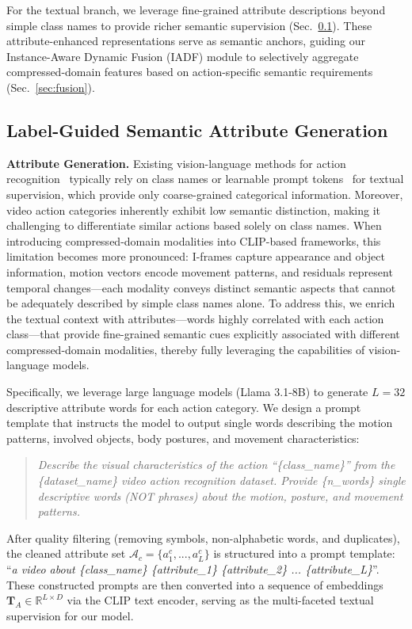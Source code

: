 \documentclass[runningheads]{llncs}
\begin{document}
For the textual branch, we leverage fine-grained attribute descriptions beyond simple class names to provide richer semantic supervision (Sec.~\ref{sec:attribute}). These attribute-enhanced representations serve as semantic anchors, guiding our Instance-Aware Dynamic Fusion (IADF) module to selectively aggregate compressed-domain features based on action-specific semantic requirements (Sec.~\ref{sec:fusion}).

\subsection{Label-Guided Semantic Attribute Generation}
\label{sec:attribute}

\noindent\textbf{Attribute Generation.} 
Existing vision-language methods for action recognition~\cite{wang2021actionclipnewparadigmvideo,ni2022expanding} typically rely on class names or learnable prompt tokens~\cite{zhou2022learning} for textual supervision, which provide only coarse-grained categorical information. Moreover, video action categories inherently exhibit low semantic distinction, making it challenging to differentiate similar actions based solely on class names. When introducing compressed-domain modalities into CLIP-based frameworks, this limitation becomes more pronounced: I-frames capture appearance and object information, motion vectors encode movement patterns, and residuals represent temporal changes---each modality conveys distinct semantic aspects that cannot be adequately described by simple class names alone. To address this, we enrich the textual context with attributes---words highly correlated with each action class---that provide fine-grained semantic cues explicitly associated with different compressed-domain modalities, thereby fully leveraging the capabilities of vision-language models.

Specifically, we leverage large language models (Llama 3.1-8B) to generate $L=32$ descriptive attribute words for each action category. We design a prompt template that instructs the model to output single words describing the motion patterns, involved objects, body postures, and movement characteristics:
\begin{quote}
\textit{Describe the visual characteristics of the action ``\{class\_name\}'' from the \{dataset\_name\} video action recognition dataset. Provide \{n\_words\} single descriptive words (NOT phrases) about the motion, posture, and movement patterns.}
\end{quote}
After quality filtering (removing symbols, non-alphabetic words, and duplicates), the cleaned attribute set $\mathcal{A}_c = \{a_1^c, ..., a_L^c\}$ is structured into a prompt template: ``\textit{a video about \{class\_name\} \{attribute\_1\} \{attribute\_2\} ... \{attribute\_L\}}''. These constructed prompts are then converted into a sequence of embeddings $\mathbf{T}_A \in \mathbb{R}^{L \times D}$ via the CLIP text encoder, serving as the multi-faceted textual supervision for our model.
\end{document}
